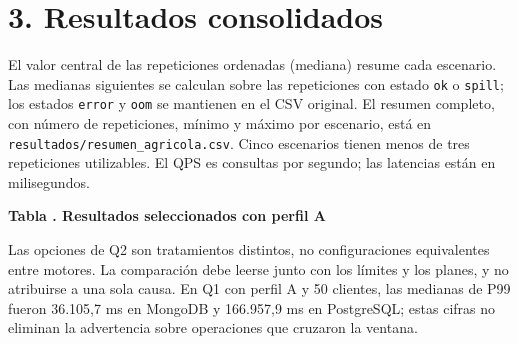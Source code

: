 \documentclass[12pt,letterpaper]{article}
\begin{document}
\section*{3. Resultados consolidados}
El valor central de las repeticiones ordenadas (mediana) resume cada escenario. Las medianas siguientes se calculan sobre las repeticiones con estado \texttt{ok} o \texttt{spill}; los estados \texttt{error} y \texttt{oom} se mantienen en el CSV original. El resumen completo, con número de repeticiones, mínimo y máximo por escenario, está en \texttt{resultados/\allowbreak{}resumen\_\allowbreak{}agricola.csv}. Cinco escenarios tienen menos de tres repeticiones utilizables. El QPS es consultas por segundo; las latencias están en milisegundos.

\par\begin{minipage}{\textwidth}\begin{center}\textbf{Tabla \thetable. Resultados seleccionados con perfil A}\par\small{}\end{center}\end{minipage}
Las opciones de Q2 son tratamientos distintos, no configuraciones equivalentes entre motores. La comparación debe leerse junto con los límites y los planes, y no atribuirse a una sola causa. En Q1 con perfil A y 50 clientes, las medianas de P99 fueron 36.105,7 ms en MongoDB y 166.957,9 ms en PostgreSQL; estas cifras no eliminan la advertencia sobre operaciones que cruzaron la ventana.
\end{document}
